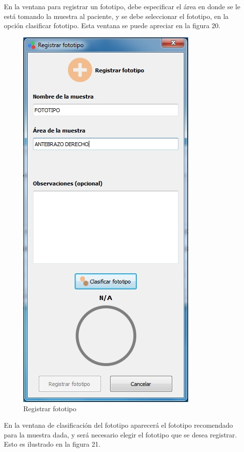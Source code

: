 		En la ventana para registrar un fototipo, debe especificar el \'{a}rea en donde se le est\'{a} tomando la muestra al paciente, y se debe seleccionar el fototipo, en la opci\'{o}n clasificar fototipo. Esta ventana se puede apreciar en la figura 20.
		
\begin{figure}[H]
  \centering
  \includegraphics[width=.5\linewidth]{./img/registrar-fototipo1.jpg}
\caption{Registrar fototipo}
\end{figure}

		En la ventana de clasificaci\'{o}n del fototipo aparecer\'{a} el fototipo recomendado para la muestra dada, y ser\'{a} necesario elegir el fototipo que se desea registrar. Esto es ilustrado en la figura 21.
		
